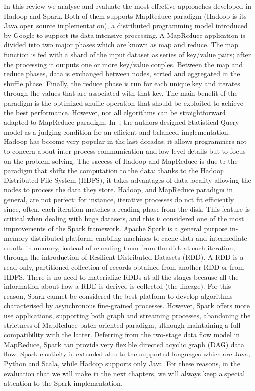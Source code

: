 In this review we analyse and evaluate the most effective approaches developed in Hadoop and Spark. Both of them supports MapReduce paradigm (Hadoop is its Java open source implementation), a distributed programming model introduced by Google to support its data intensive processing. A MapReduce application is divided into two major phases which are known as map and reduce. The map function is fed with a shard of the input dataset as series of key/value pairs; after the processing it outputs one or more key/value couples. Between the map and reduce phases, data is exchanged between nodes, sorted and aggregated in the shuffle phase. Finally, the reduce phase is run for each unique key and iterates through the values that are associated with that key. 
The main benefit of the paradigm is the optimized shuffle operation that should be exploited to achieve the best performance. However, not all algorithms can be straightforward adapted to MapReduce paradigm. In~\cite{chu2007map}, the authors designed Statistical Query model as a judging condition for an efficient and balanced implementation.
Hadoop has become very popular in the last decades; it allows programmers not to concern about inter-process communication and low-level details but to focus on the problem solving. The success of Hadoop and MapReduce is due to the paradigm that shifts the computation to the data: thanks to the Hadoop Distributed File System (HDFS), it takes advantages of data locality allowing the nodes to process the data they store.
Hadoop, and MapReduce paradigm in general, are not perfect: for instance, iterative processes do not fit efficiently since, often, each iteration matches a reading phase from the disk. This feature is critical when dealing with huge datasets, and this is considered one of the most improvements of the Spark framework.
Apache Spark is a general purpose in-memory distributed platform, enabling machines to cache data and intermediate results in memory, instead of reloading them from the disk at each iteration, through the introduction of Resilient Distributed Datasets (RDD). A RDD is a read-only, partitioned collection of records obtained from another RDD or from HDFS. There is no need to materialize RDDs at all the stages because all the information about how a RDD is derived is collected (the lineage). For this reason, Spark cannot be considered the best platform to develop algorithms characterised by asynchronous fine-grained processes. However, Spark offers more use applications, supporting both graph and streaming processes, abandoning the strictness of MapReduce batch-oriented paradigm, although maintaining a full compatibility with the latter. Deferring from the two-stage data flow model in MapReduce, Spark can provide very flexible directed acyclic graph (DAG) data flow. Spark elasticity is extended also to the supported languages which are Java, Python and Scala, while Hadoop supports only Java.
For these reasons, in the evaluation that we will make in the next chapters, we will always keep a special attention to the Spark implementation.

